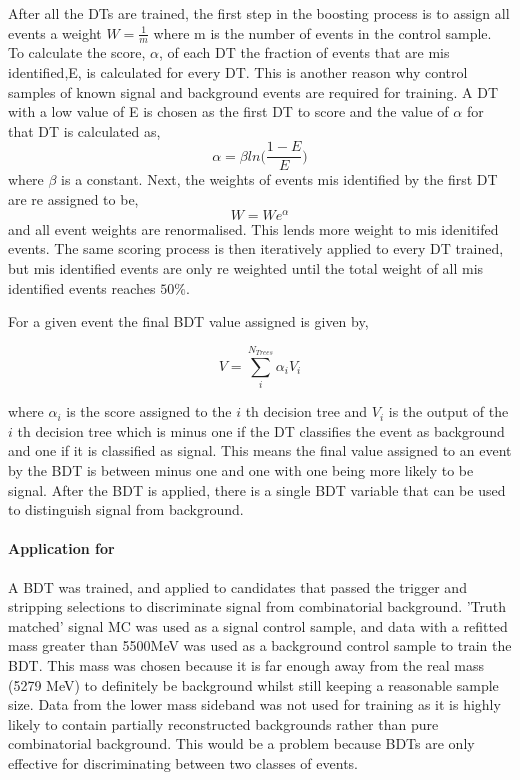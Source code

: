 After all the DTs are trained, the first step in the boosting process is to assign all events a weight $W=\frac{1}{m}$ where m is the number of events in the control sample.  To calculate the score, $\alpha$, of each DT the fraction of events that are mis identified,E, is calculated for every DT. This is another reason why control samples of known signal and background events are required for training.  A DT with a low value of E is chosen as the first DT to score and the value of $\alpha$ for that DT is calculated as,
\begin{equation}
  \alpha=\beta ln\big(\frac{1-E}{E}\big)
\end{equation}
where $\beta$ is a constant.  Next, the weights of events mis identified by the first DT are re assigned to be,
\begin{equation}
  W=W e^{\alpha}
\end{equation}
and all event weights are renormalised.  This lends more weight to mis idenitifed events. The same scoring process is then iteratively applied to every DT trained, but mis identified events are only re weighted until the total weight of all mis identified events reaches $50\%$. 

For a given event the final BDT value assigned is given by,

\begin{equation}
  V=\sum \limits_{i}^{N_{Trees}}\alpha_iV_i
\end{equation}

where $\alpha_i$ is the score assigned to the $i$ th decision tree and $V_i$ is the output of the $i$ th decision tree which is minus one if the DT classifies the event as background and one if it is classified as signal.  This means the final value assigned to an event by the BDT is between minus one and one with one being more likely to be signal.  After the BDT is applied, there is a single BDT variable that can be used to distinguish signal from background.

\paragraph{Application for \Bd \to \Kstar \etaz}
A BDT was trained, and applied to candidates that passed the trigger and stripping selections to discriminate signal from combinatorial background.  'Truth matched' signal MC was used as a signal control sample, and data with a refitted \Bd mass greater than 5500MeV was used as a background control sample to train the BDT.  This mass was chosen because it is far enough away from the real \Bd mass (5279 MeV) to definitely be background whilst still keeping a reasonable sample size.  Data from the lower mass sideband was not used for training as it is highly likely to contain partially reconstructed backgrounds rather than pure combinatorial background.  This would be a problem because BDTs are only effective for discriminating between two classes of events.

